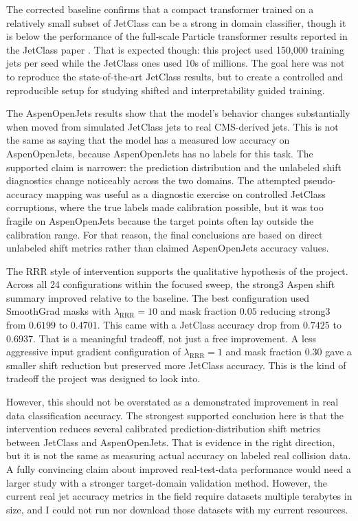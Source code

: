 \documentclass[11pt]{article}
\begin{document}
The corrected baseline confirms that a compact transformer trained on a relatively small subset of JetClass can be a strong in domain classifier, though it is below the performance of the full-scale Particle transformer results reported in the JetClass paper \cite{qu2022particle}. That is expected though: this project used 150,000 training jets per seed while the JetClass ones used 10s of millions. The goal here was not to reproduce the state-of-the-art JetClass results, but to create a controlled and reproducible setup for studying shifted and interpretability guided training.

The AspenOpenJets results show that the model's behavior changes substantially when moved from simulated JetClass jets to real CMS-derived jets. This is not the same as saying that the model has a measured low accuracy on AspenOpenJets, because AspenOpenJets has no labels for this task. The supported claim is narrower: the prediction distribution and the unlabeled shift diagnostics change noticeably across the two domains. The attempted pseudo-accuracy mapping was useful as a diagnostic exercise on controlled JetClass corruptions, where the true labels made calibration possible, but it was too fragile on AspenOpenJets because the target points often lay outside the calibration range. For that reason, the final conclusions are based on direct unlabeled shift metrics rather than claimed AspenOpenJets accuracy values.


The RRR style of intervention supports the qualitative hypothesis of the project. Across all 24 configurations within the focused sweep, the strong3 Aspen shift summary improved relative to the baseline. The best configuration used SmoothGrad masks with $\lambda_{\mathrm{RRR}}=10$ and mask fraction $0.05$ reducing strong3 from $0.6199$ to 
$0.4701$. This came with a JetClass accuracy drop from $0.7425$ to $0.6937$. That is a meaningful tradeoff, not just a free improvement. A less aggressive input gradient configuration of $\lambda_{\mathrm{RRR}}=1$ and mask fraction $0.30$ gave a smaller shift reduction but preserved more JetClass accuracy. This is the kind of tradeoff the project was designed to look into.

However, this should not be overstated as a demonstrated improvement in real data classification accuracy. The strongest supported conclusion here is that the intervention reduces several calibrated prediction-distribution shift metrics between JetClass and AspenOpenJets. That is evidence in the right direction, but it is not the same as measuring actual accuracy on labeled real collision data. A fully convincing claim about improved real-test-data performance would need a larger study with a stronger target-domain validation method. However, the current real jet accuracy metrics in the field require datasets multiple terabytes in size, and I could not run nor download those datasets with my current resources.
\end{document}

